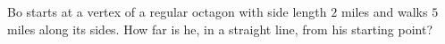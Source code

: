 Bo starts at a vertex of a regular octagon with side length $2$ miles and walks $5$ miles along its sides. How far is he, in a straight line, from his starting point?
